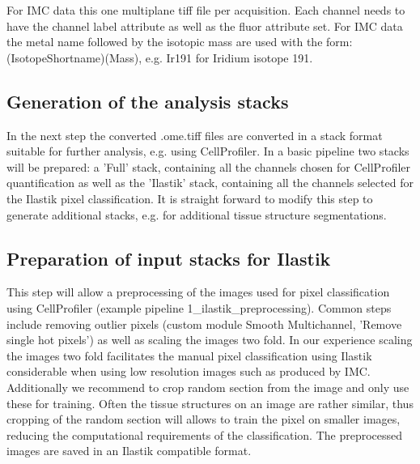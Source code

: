 \documentclass[a4paper]{article}
\begin{document}
For IMC data this one multiplane tiff file per acquisition. Each channel needs to have the channel
label attribute as well as the fluor attribute set. For IMC data the metal name followed by the
isotopic mass are used with the form: (IsotopeShortname)(Mass), e.g. Ir191 for Iridium isotope 191.

\subsection{Generation of the analysis stacks}
In the next step the converted .ome.tiff files are converted in a stack format suitable for further
analysis, e.g. using CellProfiler. In a basic pipeline two stacks will be prepared: a 'Full' stack, containing all 
the channels chosen for CellProfiler quantification as well as the 'Ilastik' stack, containing all the
channels selected for the Ilastik pixel classification. It is straight forward to modify this step to generate additional
stacks, e.g. for additional tissue structure segmentations.

\subsection{Preparation of input stacks for Ilastik}
This step will allow a preprocessing of the images used for pixel classification using CellProfiler (example
pipeline 1\_ilastik\_preprocessing). Common steps include removing outlier pixels (custom module Smooth Multichannel, 'Remove single hot pixels') as well as scaling the
images two fold. In our experience scaling the images two fold facilitates the manual pixel
classification using Ilastik considerable when using low resolution images such as produced by IMC.
Additionally we recommend to crop random section from the image and only use these for training.
Often the tissue structures on an image are rather similar, thus cropping of the random section will allows to train the pixel
on smaller images, reducing the computational requirements of the classification.
The preprocessed images are saved in an Ilastik compatible format.
\end{document}
